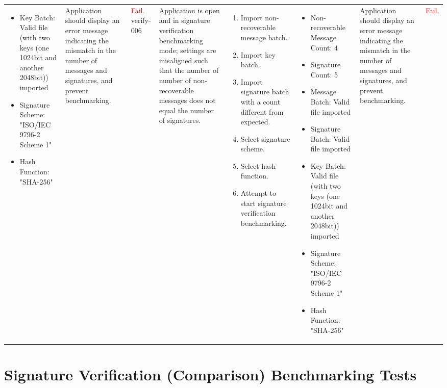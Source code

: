 \documentclass[]{final_report}
\theoremstyle{definition}
\begin{document}
\begin{longtable}{|l|p{2.5cm}|p{2.8cm}|p{3cm}|p{2cm}|p{1.5cm}|}
\begin{itemize}
\item Key Batch: Valid file  (with two keys (one 1024bit and another 2048bit)) imported 
\item Signature Scheme: "ISO/IEC 9796-2 Scheme 1"
\item Hash Function: "SHA-256"
\end{itemize} &
Application should display an error message indicating the mismatch in the number of messages and signatures, and prevent benchmarking. &  \textcolor{red}{Fail.} \
\hline
verify-006 & Application is open and in signature verification benchmarking mode; settings are misaligned such that the number of number of non-recoverable messages does not equal the number of signatures. &
\begin{enumerate}
\item Import non-recoverable message batch.
\item Import key batch.
\item Import signature batch with a count different from expected.
\item Select signature scheme.
\item Select hash function.
\item Attempt to start signature verification benchmarking.
\end{enumerate} &
\begin{itemize}
\item Non-recoverable Message Count: 4
\item Signature Count: 5
\item Message Batch: Valid file imported
\item Signature Batch: Valid file imported
\item Key Batch: Valid file  (with two keys (one 1024bit and another 2048bit)) imported 
\item Signature Scheme: "ISO/IEC 9796-2 Scheme 1"
\item Hash Function: "SHA-256"
\end{itemize} &
Application should display an error message indicating the mismatch in the number of messages and signatures, and prevent benchmarking. &  \textcolor{red}{Fail.} \
\hline

\end{longtable}


\section*{Signature Verification (Comparison) Benchmarking Tests} 
\end{document}
